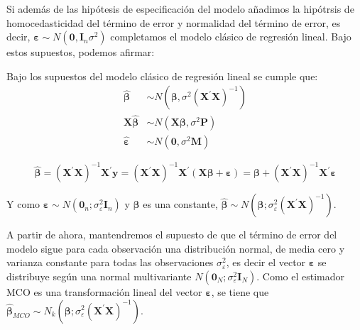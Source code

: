 Si adem\'as de las hip\'otesis de especificaci\'on del modelo a\~nadimos la hip\'otrsis de homocedasticidad del t\'ermino de error y normalidad del t\'ermino de error, es decir, $\boldsymbol{\varepsilon}\sim N(\boldsymbol{0},\boldsymbol{I}_n\sigma^2)$ completamos el modelo cl\'asico de regresi\'on lineal. Bajo estos supuestos, podemos afirmar:
\begin{teorema}
Bajo los supuestos del modelo cl\'asico de regresi\'on lineal se cumple que:
\begin{align*}
\hat{\boldsymbol{\beta}}&\sim N(\boldsymbol{\beta}, \sigma^2\left(\boldsymbol{X}^{\prime}\boldsymbol{X}\right)^{-1}) \\
\boldsymbol{X}\hat{\boldsymbol{\beta}}&\sim N(\boldsymbol{X}\boldsymbol{\beta}, \sigma^2\boldsymbol{P}) \\
\hat{\boldsymbol{\varepsilon}}&\sim N(\boldsymbol{0}, \sigma^2\boldsymbol{M}) 
\end{align*}
\end{teorema}

\begin{equation*}
\hat{\boldsymbol{\beta}}=\left(\boldsymbol{X}^{\prime}\boldsymbol{X}\right)^{-1}\boldsymbol{X}^{\prime}\boldsymbol{y}=\left(\boldsymbol{X}^{\prime}\boldsymbol{X}\right)^{-1}\boldsymbol{X}^{\prime}
(\boldsymbol{X}\boldsymbol{\beta}+\boldsymbol{\varepsilon})=\boldsymbol{\beta}+\left(\boldsymbol{X}^{\prime}\boldsymbol{X}\right)^{-1}\boldsymbol{X}^{\prime}\boldsymbol{\varepsilon}
\end{equation*}

Y como $\boldsymbol{\varepsilon}\sim N(\boldsymbol{0}_n;\sigma^2_\varepsilon\boldsymbol{I}_n)$ y $\boldsymbol{\beta}$ es una constante, $\hat{\boldsymbol{\beta}}\sim N(\boldsymbol{\beta};\sigma^2_\varepsilon\left(\boldsymbol{X}^{\prime}\boldsymbol{X}\right)^{-1})$.





A partir de ahora, mantendremos el supuesto de que el t\'ermino de error
del modelo sigue para cada observaci\'on una distribuci\'on normal, de
media cero y varianza constante para todas las observaciones $\sigma_{\varepsilon}^{2}$,
es decir el vector $\boldsymbol{\varepsilon}$ se distribuye seg\'un una normal
multivariante $N\left(\boldsymbol{0}_{N};\sigma_{\varepsilon}^{2}\boldsymbol{I}_{N}\right)$.
Como el estimador MCO es una transformaci\'on lineal del vector $\boldsymbol{\varepsilon}$,
se tiene que $\hat{\boldsymbol{\beta}}_{MCO}\sim N_{k}\left(\boldsymbol{\beta};\sigma_{\varepsilon}^{2}\left(\boldsymbol{X}^{\prime}\boldsymbol{X}\right)^{-1}\right)$.

